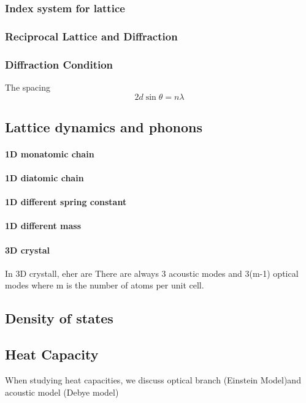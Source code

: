 \documentclass[12pt,a4paper]{article}
\begin{document}
        \subsubsection{Index system for lattice}
        \subsubsection{Reciprocal Lattice and Diffraction}
        \subsubsection{Diffraction Condition}
        The spacing 
        \begin{equation}
            2 d \sin \theta=n \lambda
        \end{equation}
\subsection{Lattice dynamics and phonons}
\paragraph{1D monatomic chain}
\paragraph{1D diatomic chain}
\paragraph{1D different spring constant}
\paragraph{1D different mass}
\paragraph{3D crystal}
In 3D crystall, eher are 
There are always 3 acoustic modes and 3(m-1) optical modes where m is the number of atoms per unit cell.
\subsection{Density of states}
\subsection{Heat Capacity} 
    When studying heat capacities, we discuss optical branch (Einstein Model)and acoustic model (Debye model)
\end{document}
